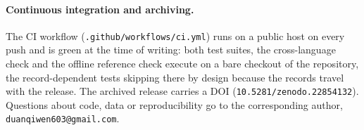 \documentclass[11pt]{article}
\newcommand{\code}[1]{\texttt{#1}}
\begin{document}
\paragraph{Continuous integration and archiving.} The CI workflow
(\code{.github/workflows/ci.yml}) runs on a public host on every push and is
green at the time of writing: both test suites, the cross-language check and
the offline reference check execute on a bare checkout of the repository,
the record-dependent tests skipping there by design because the records
travel with the release. The archived
release carries a DOI (\code{10.5281/zenodo.22854132}). Questions
about code, data or reproducibility go to the corresponding author,
\code{duanqiwen603@gmail.com}.
\end{document}
